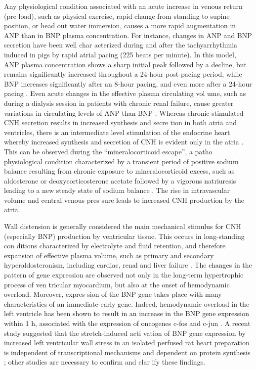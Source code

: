 \documentclass[14pt,a4paper,onecolumn]{extarticle}
\begin{document}
Any physiological condition associated with an acute increase in venous return (pre load), such as physical exercise, rapid change from standing to supine position, or head out water immersion, causes a more rapid augmentation in ANP than in BNP plasma concentration. For instance, changes in ANP and BNP secretion have been well char acterized during and after the tachyarrhythmia induced in pigs by rapid atrial pacing (225 beats per minute). In this model, ANP plasma concentration shows a sharp initial peak followed by a decline, but remains significantly increased throughout a 24-hour post pacing period, while BNP increases significantly after an 8-hour pacing, and even more after a 24-hour pacing \citep{29}. Even acute changes in the effective plasma circulating vol ume, such as during a dialysis session in patients with chronic renal failure, cause greater variations in circulating levels of ANP than BNP \citep{30}.  Whereas chronic stimulated CNH secretion results in increased synthesis and secre tion in both atria and ventricles, there is an intermediate level stimulation of the endocrine heart whereby increased synthesis and secretion of CNH is evident only in the atria \citep{12}\citep{13}. This can be observed during the “mineralocorticoid escape”, a patho physiological condition characterized by a transient period of positive sodium balance resulting from chronic exposure to mineralocorticoid excess, such as aldosterone or deoxycorticosterone acetate followed by a vigorous natriuresis leading to a new steady state of sodium balance \citep{12}\citep{13}. The rise in intravascular volume and central venous pres sure leads to increased CNH production by the atria.

Wall distension is generally considered the main mechanical stimulus for CNH (especially BNP) production by ventricular tissue. This occurs in long-standing con ditions characterized by electrolyte and fluid retention, and therefore expansion of effective plasma volume, such as primary \citep{31} and secondary hyperaldosteronism, including cardiac, renal and liver failure \citep{12}\citep{13}\citep{18}\citep{30}. The changes in the pattern of gene expression are observed not only in the long-term hypertrophic process of ven tricular myocardium, but also at the onset of hemodynamic overload. Moreover, expres sion of the BNP gene takes place with many characteristics of an immediate-early gene. Indeed, hemodynamic overload in the left ventricle has been shown to result in an increase in the BNP gene expression within 1 h, associated with the expression of oncogenes c-fos and c-jun \citep{32}. A recent study suggested that the stretch-induced acti vation of BNP gene expression by increased left ventricular wall stress in an isolated perfused rat heart preparation is independent of transcriptional mechanisms and dependent on protein synthesis \citep{32}; other studies are necessary to confirm and clar ify these findings.
\end{document}
